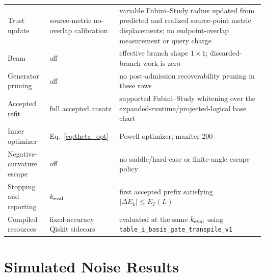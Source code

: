 \documentclass[
  reprint,
  amsmath,
  amssymb,
  aps,
  pra,
  nofootinbib,
  superscriptaddress,
  floatfix
]{revtex4-2}
\begin{document}
\begin{table}[t]
{\begin{tabular}{@{}p{}p{}p{}@{}}
Trust update & source-metric no-overlap calibration & variable Fubini--Study radius updated from predicted and realized source-point metric displacements; no endpoint-overlap measurement or query charge \\
Beam & off & effective branch shape \(1\times1\); discarded-branch work is zero \\
Generator pruning & off & no post-admission recoverability pruning in these rows \\
Accepted refit & full accepted ansatz & supported Fubini--Study whitening over the expanded-runtime/projected-logical base chart \\
Inner optimizer & Eq.~\eqref{eq:theta_opt} & Powell optimizer; maxiter 200 \\
Negative-curvature escape & off & no saddle/hard-case or finite-angle escape policy \\
Stopping and reporting & \(k_{\rm eval}\) & first accepted prefix satisfying \(\lvert\Delta E_k\rvert\le E_T(L)\) \\
Compiled resources & fixed-accuracy Qiskit sidecars & evaluated at the same \(k_{\rm eval}\) using \texttt{table\_i\_basis\_gate\_transpile\_v1} \\
\bottomrule
\end{tabular}%
}
\end{table}

\section{Simulated Noise Results}
\label{app:noise_selection_robustness}
\label{app:finite_shot_score_robustness}
\end{document}

